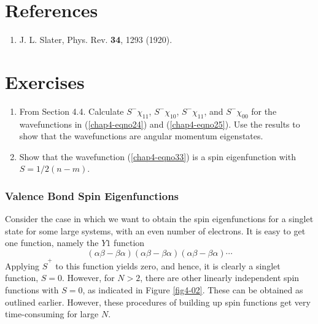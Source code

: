 \section{References}
\begin{enumerate}
\item J. L. Slater, Phys. Rev. {\bf 34}, 1293 (1920).
\end{enumerate}

\section{Exercises}
\begin{enumerate}
\item From Section 4.4. Calculate $S^-\chi_{11}$, $S^-\chi_{10}$,
$S^-\chi_{11}$, and $S^-\chi_{00}$ for the wavefunctions in
(\ref{chap4-eqno24}) and (\ref{chap4-eqno25}). Use the results to show
that the wavefunctions are angular momentum eigenstates.

\item Show that the wavefunction (\ref{chap4-eqno33}) is a spin
eigenfunction with $S = 1/2(n - m)$.
\end{enumerate}


\subsubsection{Valence Bond Spin Eigenfunctions}

Consider the case in which we want to obtain the spin eigenfunctions 
for a singlet state for some large systems, with an even number of electrons.  
It is easy to get one function, namely the $Y1$ function
\begin{equation}
\left( \alpha \beta - \beta \alpha \right) \left( \alpha \beta - 
\beta \alpha \right) \left( \alpha \beta - \beta \alpha \right) 
\cdots
\label{chap4app-eqno22}
\end{equation}
Applying ${\hat S}^+$ to this function yields zero, and hence, it is
clearly a singlet function, $S = 0$.  However, for $N > 2$, there are
other linearly independent spin functions with $S = 0$, as indicated
in Figure \ref{fig4-02}. These can be obtained as outlined
earlier. However, these procedures of building up spin functions get
very time-consuming for large $N$.

